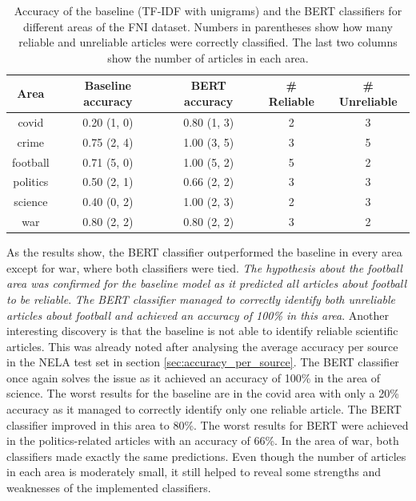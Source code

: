 \begin{table}[H]
    \centering
\begin{tabular}{|c|c|c|c|c|}
\hline
\textbf{Area} & \textbf{Baseline accuracy} & \textbf{BERT accuracy} & \textbf{\# Reliable} & \textbf{\# Unreliable} \\ \hline
covid    & 0.20 (1, 0) & 0.80 (1, 3) & 2 & 3 \\ \hline
crime    & 0.75 (2, 4) & 1.00 (3, 5) & 3 & 5 \\ \hline
football & 0.71 (5, 0) & 1.00 (5, 2) & 5 & 2 \\ \hline
politics & 0.50 (2, 1) & 0.66 (2, 2) & 3 & 3 \\ \hline
science  & 0.40 (0, 2) & 1.00 (2, 3) & 2 & 3 \\ \hline
war      & 0.80 (2, 2) & 0.80 (2, 2) & 3 & 2 \\ \hline
\end{tabular}
    \caption{Accuracy of the baseline (TF-IDF with unigrams) and the BERT classifiers for different areas of the FNI dataset. Numbers in parentheses show how many reliable and unreliable articles were correctly classified. The last two columns show the number of articles in each area.}
    \label{tab:ood_areas_anal}
\end{table}

As the results show, the BERT classifier outperformed the baseline in every area except for war, where both classifiers were tied. \emph{The hypothesis about the football area was confirmed for the baseline model as it predicted all articles about football to be reliable}. \emph{The BERT classifier managed to correctly identify both unreliable articles about football and achieved an accuracy of 100\% in this area}. 
Another interesting discovery is that the baseline is not able to identify reliable scientific articles. This was already noted after analysing the average accuracy per source in the NELA test set in section \ref{sec:accuracy_per_source}. The BERT classifier once again solves the issue as it achieved an accuracy of 100\% in the area of science.
The worst results for the baseline are in the covid area with only a 20\% accuracy as it managed to correctly identify only one reliable article. The BERT classifier improved in this area to 80\%. The worst results for BERT were achieved in the politics-related articles with an accuracy of 66\%. In the area of war, both classifiers made exactly the same predictions. Even though the number of articles in each area is moderately small, it still helped to reveal some strengths and weaknesses of the implemented classifiers. 

